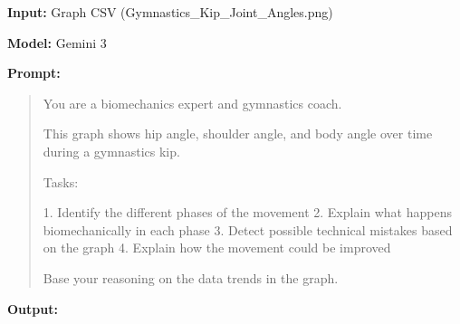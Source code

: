 \textbf{Input:} Graph CSV (Gymnastics\_Kip\_Joint\_Angles.png)

\textbf{Model:} Gemini 3

\textbf{Prompt:}

\begin{quote}
You are a biomechanics expert and gymnastics coach.

This graph shows hip angle, shoulder angle, and body angle over time
during a gymnastics kip.

Tasks:

1. Identify the different phases of the movement
2. Explain what happens biomechanically in each phase
3. Detect possible technical mistakes based on the graph
4. Explain how the movement could be improved

Base your reasoning on the data trends in the graph.
\end{quote}

\textbf{Output:}

